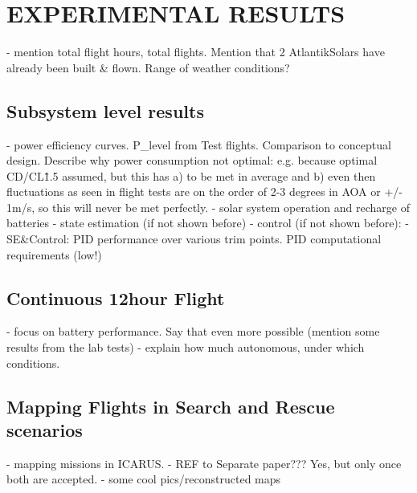  \section{EXPERIMENTAL RESULTS}
 - mention total flight hours, total flights. Mention that 2 AtlantikSolars have already been built \& flown.  Range of weather conditions?
 \subsection{Subsystem level results}
   - power efficiency curves. P\_level from Test flights. Comparison to conceptual design. Describe why power consumption not optimal: e.g. because optimal CD/CL\^1.5 assumed, but this has a) to be met in average and b) even then fluctuations as seen in flight tests are on the order of 2-3 degrees in AOA or +/- 1m/s, so this will never be met perfectly.
 - solar system operation and recharge of batteries
 - state estimation (if not shown before)
 - control (if not shown before):   - SE\&Control: PID performance over various trim points. PID computational requirements (low!)
  \subsection{Continuous 12hour Flight}
   - focus on battery performance. Say that even more possible (mention some results from the lab tests)
   - explain how much autonomous, under which conditions.
  \subsection{Mapping Flights in Search and Rescue scenarios}
    - mapping missions in ICARUS. 
    - REF to Separate paper??? Yes, but only once both are accepted.
    - some cool pics/reconstructed maps
